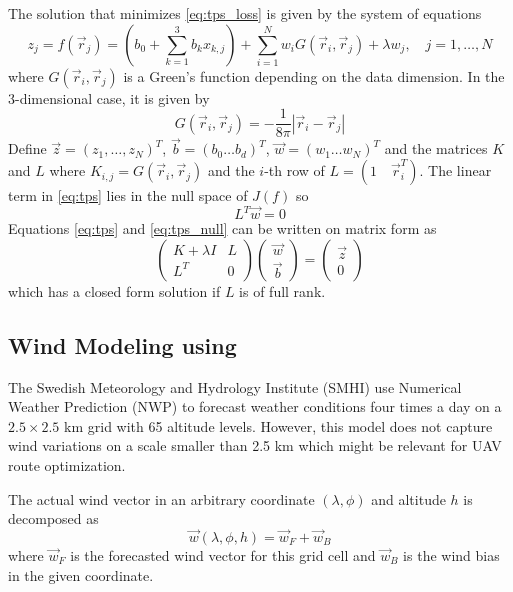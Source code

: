 The solution that minimizes \eqref{eq:tps_loss} is given by the system of equations
\begin{equation}\label{eq:tps}
    z_j = f(\vec{r}_j) =   \left( b_0 + \sum_{k=1}^3 b_kx_{k,j} \right) +\sum_{i=1}^Nw_iG(\vec{r}_i,\vec{r}_j)+ \lambda w_j, \quad j=1,\ldots,N
\end{equation}
where $G(\vec{r}_i,\vec{r}_j)$ is a Green's function depending on the data dimension. In the 3-dimensional case, it is given by
\begin{equation}
    G(\vec{r}_i,\vec{r}_j)=-\frac{1}{8\pi}|\vec{r}_i-\vec{r}_j|
\end{equation}
Define $\vec{z}=(z_1,\ldots,z_N)^T$, $\vec{b}=(b_0 \ldots b_d)^T$, $\vec{w}=(w_1 \ldots w_N)^T$ and the matrices $K$ and $L$ where $K_{i,j}=G(\vec{r}_i,\vec{r}_j)$ and the $i$-th row of $L=(1\quad \vec{r}_i^T)$. The linear term in \eqref{eq:tps} lies in the null space of $J(f)$ so 
\begin{equation}\label{eq:tps_null}
    L^T\vec{w}=0
\end{equation}
Equations \eqref{eq:tps} and \eqref{eq:tps_null} can be written on matrix form as
\begin{equation}\label{eq:tps_closed_form}
    \begin{pmatrix}
        K+\lambda I & L \\
        L^T & 0
    \end{pmatrix}
    \begin{pmatrix}
        \vec{w} \\
        \vec{b}
    \end{pmatrix}
    =
    \begin{pmatrix}
        \vec{z} \\
        0
    \end{pmatrix}
\end{equation}
which has a closed form solution if $L$ is of full rank.
\subsection{Wind Modeling using \abbrTPS}
The Swedish Meteorology and Hydrology Institute (SMHI) use Numerical Weather Prediction (NWP) to forecast weather conditions four times a day on a $2.5\times2.5$ km grid with 65 altitude levels. However, this model does not capture wind variations on a scale smaller than 2.5 km which might be relevant for UAV route optimization.

The actual wind vector in an arbitrary coordinate $(\lambda,\phi)$ and altitude $h$ is decomposed as 
\begin{equation}
    \vec{w}(\lambda,\phi,h)=\vec{w}_F + \vec{w}_B
\end{equation}
where $\vec{w}_F$ is the forecasted wind vector for this grid cell and $\vec{w}_B$ is the wind bias in the given coordinate.


